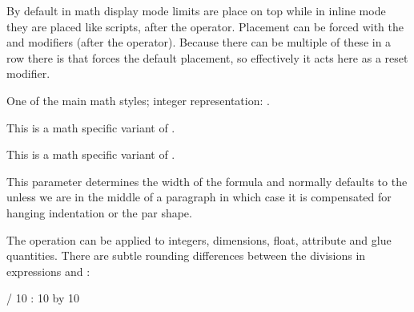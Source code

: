 \stopoldprimitive

\startoldprimitive[title={\prm {displaylimits}}]

By default in math display mode limits are place on top while in inline mode they
are placed like scripts, after the operator. Placement can be forced with the
 and  modifiers (after the operator). Because there
can be multiple of these in a row there is  that forces the
default placement, so effectively it acts here as a reset modifier.

\stopoldprimitive

\startoldprimitive[title={\prm {displaystyle}}]

One of the main math styles; integer representation: \the\displaystyle.

\stopoldprimitive

\startoldprimitive[title={\prm {displaywidowpenalties}}]

This is a math specific variant of .

\stopoldprimitive

\startoldprimitive[title={\prm {displaywidowpenalty}}]

This is a math specific variant of .

\stopoldprimitive

\startoldprimitive[title={\prm {displaywidth}}]

This parameter determines the width of the formula and normally defaults to the
 unless we are in the middle of a paragraph in which case it is
compensated for hanging indentation or the par shape.

\stopoldprimitive

\startoldprimitive[title={\prm {divide}}]

The  operation can be applied to integers, dimensions, float,
attribute and glue quantities. There are subtle rounding differences between
the divisions in expressions and :

\starttabulate
\NC {}
\EQ        {} \the\numexpr\scratchcounter/ 10\relax
\NC \NR
\NC {}
\EQ        {} \the\numexpr\scratchcounter: 10\relax
\NC \NR
\NC {}
\EQ        {} \divide\scratchcounter by 10
                               \the\scratchcounter
\NC \NR
\stoptabulate

